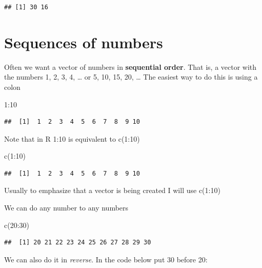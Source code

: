 \documentclass[
]{book}
\newenvironment{Shaded}{\begin{snugshade}}{\end{snugshade}}
\newcommand{\DecValTok}[1]{\textcolor[rgb]{0.00,0.00,0.81}{#1}}
\newcommand{\FunctionTok}[1]{\textcolor[rgb]{0.00,0.00,0.00}{#1}}
\newcommand{\NormalTok}[1]{#1}
\newcommand{\SpecialCharTok}[1]{\textcolor[rgb]{0.00,0.00,0.00}{#1}}
\begin{document}
\begin{verbatim}
## [1] 30 16
\end{verbatim}

\hypertarget{sequences-of-numbers}{%
\section{Sequences of numbers}\label{sequences-of-numbers}}

Often we want a vector of numbers in \textbf{sequential order}. That is, a vector with the numbers 1, 2, 3, 4, \ldots{} or 5, 10, 15, 20, \ldots{} The easiest way to do this is using a colon

\begin{Shaded}
\begin{Highlighting}[]
\DecValTok{1}\SpecialCharTok{:}\DecValTok{10}
\end{Highlighting}
\end{Shaded}

\begin{verbatim}
##  [1]  1  2  3  4  5  6  7  8  9 10
\end{verbatim}

Note that in R 1:10 is equivalent to c(1:10)

\begin{Shaded}
\begin{Highlighting}[]
\FunctionTok{c}\NormalTok{(}\DecValTok{1}\SpecialCharTok{:}\DecValTok{10}\NormalTok{)}
\end{Highlighting}
\end{Shaded}

\begin{verbatim}
##  [1]  1  2  3  4  5  6  7  8  9 10
\end{verbatim}

Usually to emphasize that a vector is being created I will use c(1:10)

We can do any number to any numbers

\begin{Shaded}
\begin{Highlighting}[]
\FunctionTok{c}\NormalTok{(}\DecValTok{20}\SpecialCharTok{:}\DecValTok{30}\NormalTok{)}
\end{Highlighting}
\end{Shaded}

\begin{verbatim}
##  [1] 20 21 22 23 24 25 26 27 28 29 30
\end{verbatim}

We can also do it in \emph{reverse}. In the code below put 30 before 20:
\end{document}

